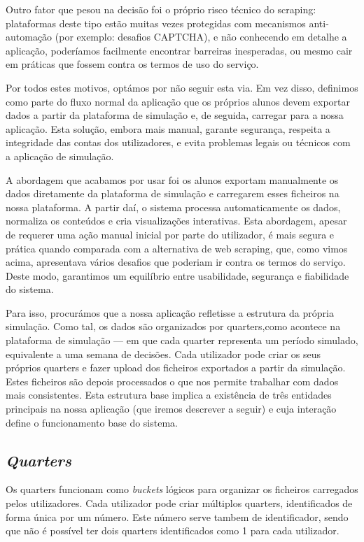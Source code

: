 Outro fator que pesou na decisão foi o próprio risco técnico do scraping: plataformas deste tipo estão muitas vezes protegidas com mecanismos anti-automação (por exemplo: desafios CAPTCHA), e não conhecendo em detalhe a aplicação, poderíamos facilmente encontrar barreiras inesperadas, ou mesmo cair em práticas que fossem contra os termos de uso do serviço.

Por todos estes motivos, optámos por não seguir esta via. Em vez disso, definimos como parte do fluxo normal da aplicação que os próprios alunos devem exportar dados a partir da plataforma de simulação e, de seguida, carregar para a nossa aplicação. Esta solução, embora mais manual, garante segurança, respeita a integridade das contas dos utilizadores, e evita problemas legais ou técnicos com a aplicação de simulação.

A abordagem que acabamos por usar foi os alunos exportam manualmente os dados diretamente da plataforma de simulação e carregarem esses ficheiros na nossa plataforma. A partir daí, o sistema processa automaticamente os dados, normaliza os conteúdos e cria visualizações interativas. Esta abordagem, apesar de requerer uma ação manual inicial por parte do utilizador, é mais segura e prática quando comparada com a alternativa de web scraping, que, como vimos acima, apresentava vários desafios que poderiam ir contra os termos do serviço. Deste modo, garantimos um equilíbrio entre usabilidade, segurança e fiabilidade do sistema.

Para isso, procurámos que a nossa aplicação refletisse a estrutura da própria simulação. Como tal, os dados são organizados por quarters,como acontece na plataforma de simulação — em que cada quarter representa um período simulado, equivalente a uma semana de decisões. Cada utilizador pode criar os seus próprios quarters e fazer upload dos ficheiros exportados a partir da simulação. Estes ficheiros são depois processados o que nos permite trabalhar com dados mais consistentes. Esta estrutura base implica a existência de três entidades principais na nossa aplicação (que iremos descrever a seguir) e cuja interação define o funcionamento base do sistema.

\subsection{\textit{Quarters}}
Os quarters funcionam como \textit{buckets} lógicos para organizar os ficheiros carregados pelos utilizadores. Cada utilizador pode criar múltiplos quarters, identificados de forma única por um número. Este número serve tambem de identificador, sendo que não é possível ter dois quarters identificados como 1 para cada utilizador.

